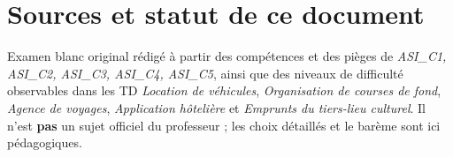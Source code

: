\documentclass[10pt,a4paper]{article}
\begin{document}
\section*{Sources et statut de ce document}
Examen blanc original rédigé à partir des compétences et des pièges de \textit{ASI\_C1, ASI\_C2, ASI\_C3, ASI\_C4, ASI\_C5}, ainsi que des niveaux de difficulté observables dans les TD \textit{Location de véhicules}, \textit{Organisation de courses de fond}, \textit{Agence de voyages}, \textit{Application hôtelière} et \textit{Emprunts du tiers-lieu culturel}. Il n'est \textbf{pas} un sujet officiel du professeur ; les choix détaillés et le barème sont ici pédagogiques.
\end{document}
